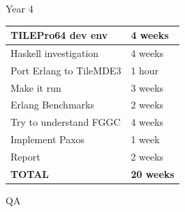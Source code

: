 \documentclass[14pt]{beamer}
\begin{document}
\begin{frame}{Year 4}
    \begin{tabular}{|l|l|}
        \hline
        TILEPro64 dev env & 4 weeks \\ \hline
    Haskell investigation & 4 weeks \\ \hline
  Port Erlang to TileMDE3 & 1 hour \\ \hline
              Make it run & 3 weeks \\ \hline
        Erlang Benchmarks & 2 weeks \\ \hline
   Try to understand FGGC & 4 weeks \\ \hline
          Implement Paxos & 1 week \\ \hline
                   Report & 2 weeks \\ \hline \hline
               \bf{TOTAL} & \bf{20 weeks} \\ \hline
    \end{tabular}
\end{frame}


\begin{frame}[plain]
    \begin{center}
        \huge{QA}
    \end{center}
\end{frame}
\end{document}
